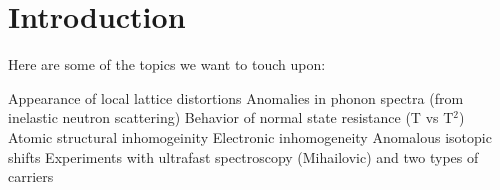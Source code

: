 \chapter{Introduction}

Here are some of the topics we want to touch upon:

Appearance of local lattice distortions
Anomalies in phonon spectra (from inelastic neutron scattering)
Behavior of normal state resistance (T vs T$^2$)
Atomic structural inhomogeinity
Electronic inhomogeneity
Anomalous isotopic shifts
Experiments with ultrafast spectroscopy (Mihailovic) and two types of carriers
